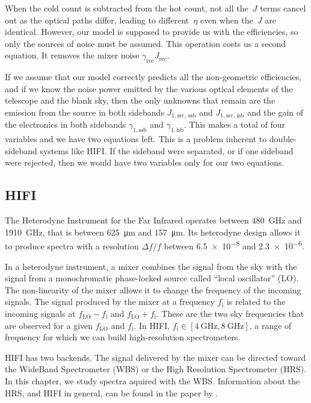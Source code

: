 When the cold count is subtracted from the hot count, not all the~$J$ terms cancel out as the optical paths differ, leading to different~$\eta$ even when the~$J$ are identical.
However, our model is supposed to provide us with the efficiencies, so only the sources of noise must be assumed.
This operation costs us a second equation.
It removes the mixer noise $\gamma_\text{rec} J_\text{rec}$.

If we assume that our model correctly predicts all the non-geometric efficiencies, and if we know the noise power emitted by the various optical elements of the telescope and the blank sky, then the only unknowns that remain are the emission from the source in both sidebands
$J_{1,\text{src, ssb}}$ and $J_{1,\text{src, isb}}$
and the gain of the electronics in both sidebands
$\gamma_{1,\text{ssb}}$ and $\gamma_{1,\text{isb}}$.
This makes a total of four variables and we have two equations left.
This is a problem inherent to double-sideband systems like HIFI.
If the sideband were separated, or if one sideband were rejected, then we would have two variables only for our two equations.



\subsection{HIFI}

The Heterodyne Instrument for the Far Infrared operates between \SI{480}{\giga\hertz} and \SI{1910}{\giga\hertz}, that is between \SI{625}{\micro\meter} and \SI{157}{\micro\meter}.
Its heterodyne design allows it to produce spectra with a resolution $\Delta f/ f$ between \num{6.5e-8} and \num{2.3e-6}.

In a heterodyne instrument, a mixer combines the signal from the sky with the signal from a monochromatic phase-locked source called ``local oscillator'' (LO).
The non-linearity of the mixer allows it to change the frequency of the incoming signals.
The signal produced by the mixer at a frequency $f_\text{i}$ is related to the incoming signals at $f_\text{LO}-f_\text{i}$ and $f_\text{LO}+f_\text{i}$.
These are the two sky frequencies that are observed for a given $f_\text{LO}$ and $f_\text{i}$.
In HIFI, $f_\text{i} \in [\SI{4}{\giga\hertz}, \SI{8}{\giga\hertz}]$, a range of frequency for which we can build high-resolution spectrometers.

HIFI has two backends.
The signal delivered by the mixer can be directed toward the WideBand Spectrometer (WBS) or the High Resolution Spectrometer (HRS).
In this chapter, we study spectra aquired with the WBS.
Information about the HRS, and HIFI in general, can be found in the paper by \citeauthor{AA_518_L6} \cite{AA_518_L6}.

